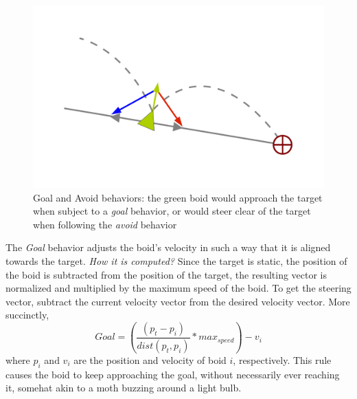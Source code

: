 \begin{figure}[htbp]
\begin{center}
\includegraphics[scale=0.5]{figures/seekANDflee.pdf}
\caption{Goal and Avoid behaviors: the green boid would approach the target when subject to a \textit{goal} behavior, or would steer clear of the target when following the \textit{avoid} behavior }
\label{seekfleePDF}
\end{center}
\end{figure}

The \textit{Goal} behavior adjusts the boid's velocity in such a way that it is aligned towards the target. \textit{How it is computed?} Since the target is static, the position of the boid is subtracted from the position of the target, the resulting vector is normalized and multiplied by the maximum speed of the boid.    To get the steering vector, subtract the current velocity vector from the desired velocity vector.  More succinctly, 
%
\begin{equation}
\label{goalEquation}
Goal = (\frac{(p_t - p_i)}{dist(p_t,p_i)} * max_{speed}) - v_i
\end{equation}
where $p_i$ and $v_i$ are the position and velocity of boid $i$, respectively. This rule causes the boid to keep approaching the goal, without necessarily ever reaching it, somehat akin  to a moth buzzing around a light bulb.

